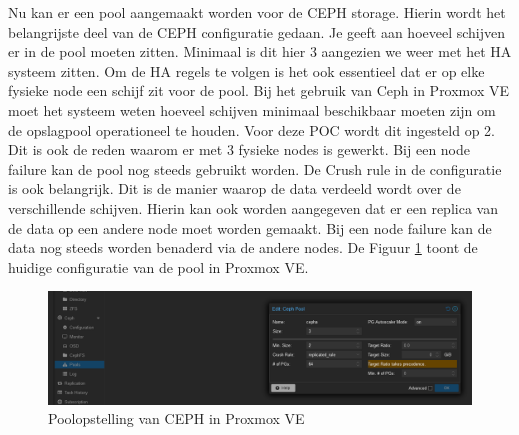 Nu kan er een pool aangemaakt worden voor de CEPH storage. Hierin wordt het belangrijste deel van de CEPH configuratie gedaan.
Je geeft aan hoeveel schijven er in de pool moeten zitten. Minimaal is dit hier 3 aangezien we weer met het HA systeem zitten. Om de HA regels te volgen is het ook essentieel dat er op elke fysieke node een schijf zit voor de pool.
Bij het gebruik van Ceph in Proxmox VE moet het systeem weten hoeveel schijven minimaal beschikbaar moeten zijn om de opslagpool operationeel te houden. Voor deze POC wordt dit ingesteld op 2. Dit is ook de reden waarom er met 3 fysieke nodes is gewerkt. Bij een node failure kan de pool nog steeds gebruikt worden.
De Crush rule in de configuratie is ook belangrijk. Dit is de manier waarop de data verdeeld wordt over de verschillende schijven. Hierin kan ook worden aangegeven dat er een replica van de data op een andere node moet worden gemaakt. Bij een node failure kan de data nog steeds worden benaderd via de andere nodes.
De Figuur \ref{fig:ceph-pool-prox} toont de huidige configuratie van de pool in Proxmox VE.
\begin{figure}[H]
  \centering
  \includegraphics[width=\textwidth, trim=10cm 0cm 0cm 0cm, clip]{../poc/ceph-pool-prox.png}
  \caption{Poolopstelling van CEPH in Proxmox VE}
  \label{fig:ceph-pool-prox}
\end{figure}


